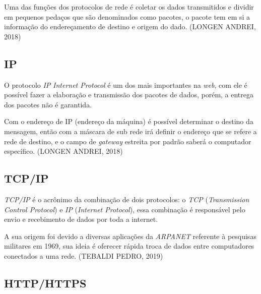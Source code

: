 \par Uma das funções dos protocolos de rede é coletar os dados transmitidos e dividir em pequenos pedaços que são denominados como pacotes, o pacote tem em si a informação do endereçamento de destino e origem do dado. (LONGEN ANDREI, 2018)

\subsection{\textbf{IP}}

\par O protocolo \textit{IP} \textit{Internet Protocol} é um dos mais importantes na \textit{web}, com ele é possível fazer a elaboração e transmissão dos pacotes de dados, porém, a entrega dos pacotes não é garantida.

\par Com o endereço de IP (endereço da máquina) é possível determinar o destino da mensagem, então com a máscara de sub rede irá definir o endereço que se refere a rede de destino, e o campo de \textit{gateway} estreita por padrão saberá o computador específico. (LONGEN ANDREI, 2018)

\newpage\thispagestyle{empty}
\subsection{\textbf{TCP/IP}}

\par \textit{TCP/IP} é o acrônimo da combinação de dois protocolos: o \textit{TCP} (\textit{Transmission Control Protocol}) e \textit{IP} (\textit{Internet Protocol}), essa combinação é responsável pelo envio e recebimento de dados por toda a internet.

\par A sua origem foi devido a diversas aplicações da \textit{ARPANET} referente à pesquisas militares em 1969, sua ideia é oferecer rápida troca de dados entre computadores conectados a uma rede. (TEBALDI PEDRO, 2019)

\subsection{\textbf{HTTP/HTTPS}}

